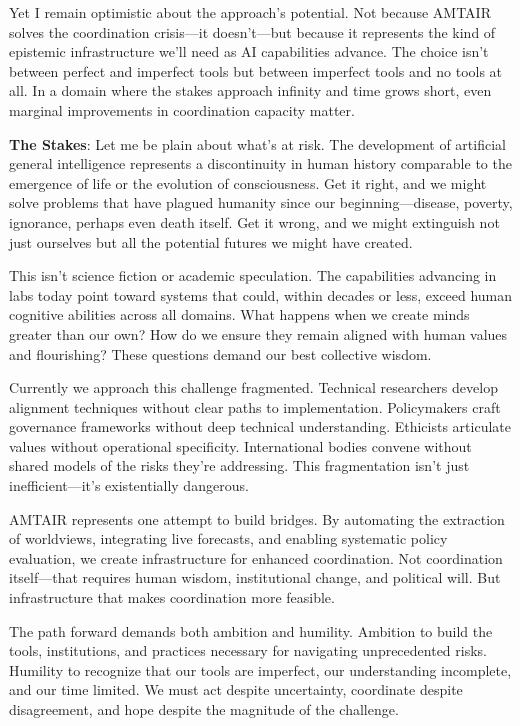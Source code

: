 \documentclass[
  11pt,
  letterpaper,
  openany]{book}
\begin{document}
Yet I remain optimistic about the approach's potential. Not because
AMTAIR solves the coordination crisis---it doesn't---but because it
represents the kind of epistemic infrastructure we'll need as AI
capabilities advance. The choice isn't between perfect and imperfect
tools but between imperfect tools and no tools at all. In a domain where
the stakes approach infinity and time grows short, even marginal
improvements in coordination capacity matter.

\textbf{The Stakes}: Let me be plain about what's at risk. The
development of artificial general intelligence represents a
discontinuity in human history comparable to the emergence of life or
the evolution of consciousness. Get it right, and we might solve
problems that have plagued humanity since our beginning---disease,
poverty, ignorance, perhaps even death itself. Get it wrong, and we
might extinguish not just ourselves but all the potential futures we
might have created.

This isn't science fiction or academic speculation. The capabilities
advancing in labs today point toward systems that could, within decades
or less, exceed human cognitive abilities across all domains. What
happens when we create minds greater than our own? How do we ensure they
remain aligned with human values and flourishing? These questions demand
our best collective wisdom.

Currently we approach this challenge fragmented. Technical researchers
develop alignment techniques without clear paths to implementation.
Policymakers craft governance frameworks without deep technical
understanding. Ethicists articulate values without operational
specificity. International bodies convene without shared models of the
risks they're addressing. This fragmentation isn't just
inefficient---it's existentially dangerous.

AMTAIR represents one attempt to build bridges. By automating the
extraction of worldviews, integrating live forecasts, and enabling
systematic policy evaluation, we create infrastructure for enhanced
coordination. Not coordination itself---that requires human wisdom,
institutional change, and political will. But infrastructure that makes
coordination more feasible.

The path forward demands both ambition and humility. Ambition to build
the tools, institutions, and practices necessary for navigating
unprecedented risks. Humility to recognize that our tools are imperfect,
our understanding incomplete, and our time limited. We must act despite
uncertainty, coordinate despite disagreement, and hope despite the
magnitude of the challenge.
\end{document}
